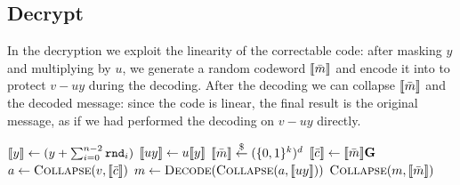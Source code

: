     \subsection{Decrypt}
    In the decryption we exploit the linearity of the correctable code: after masking $y$ and multiplying by $u$, we 
    generate a random codeword $ \llbracket \bar{m} \rrbracket $ and encode it into  to protect $v-uy$ during the decoding.
    After the decoding we can collapse $ \llbracket \bar{m} \rrbracket $ and the decoded message: since the code is linear, the final result
    is the original message, as if we had performed the decoding on $v-uy$ directly.

    \begin{algorithm2e}
        \caption{Decryption, masked version}

        $ \llbracket y \rrbracket  \gets (y+\sum_{i=0}^{n-2} \mathtt{rnd}_i)$\;
        $ \llbracket uy \rrbracket  \gets u  \llbracket y \rrbracket $\;
        $ \llbracket \bar{m} \rrbracket   \stackrel{\$}{\gets}  (\{0,1\}^k)^d$\;
        $ \llbracket \bar{c} \rrbracket  \gets  \llbracket \bar{m} \rrbracket \mathbf{G}$\; 
        $a \gets \text{\sc Collapse}(v , \llbracket \bar{c} \rrbracket )$\;
        $m \gets \text{\sc Decode}(\text{\sc Collapse}(a, \llbracket uy \rrbracket ))$\;
        \KwRet $\text{\sc Collapse}(m , \llbracket \bar{m} \rrbracket )$\;
    \end{algorithm2e}
